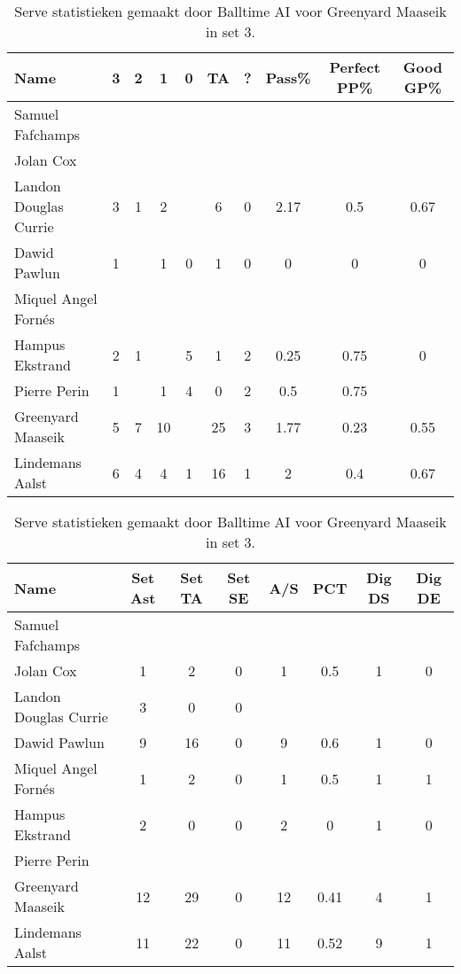 \begin{table}[ht!]
  \centering
  \scriptsize
  \begin{tabular}{|l|c|c|c|c|c|c|c|c|c|} \hline
    \textbf{Name} & 3 & 2 & 1 & 0 & TA & ? & Pass\% & Perfect PP\% & Good GP\% \\ \hline
    Samuel Fafchamps &   &   &   &   &   &   &   &   &   \\
    Jolan Cox &   &   &   &   &   &   &   &   &   \\
    Landon Douglas Currie & 3 & 1 & 2 &   & 6 & 0 & 2.17 & 0.5 & 0.67 \\
    Dawid Pawlun & 1 &   & 1 & 0 & 1 & 0 & 0 & 0 & 0 \\
    Miquel Angel Fornés &   &   &   &   &   &   &   &   &   \\
    Hampus Ekstrand & 2 & 1 &   & 5 & 1 & 2 & 0.25 & 0.75 & 0 \\
    Pierre Perin & 1 &   & 1 & 4 & 0 & 2 & 0.5 & 0.75 &   \\
    Greenyard Maaseik & 5 & 7 & 10 &   & 25 & 3 & 1.77 & 0.23 & 0.55 \\
    Lindemans Aalst & 6 & 4 & 4 & 1 & 16 & 1 & 2 & 0.4 & 0.67 \\ \hline
  \end{tabular}
  \caption[Receive statistieken gemaakt door Balltime AI voor Greenyard Maaseik in set 3]{\label{tab:PL3ReceiveGreenyard3}Serve statistieken gemaakt door Balltime AI voor Greenyard Maaseik in set 3.}
\end{table}

\begin{table}[ht!]
  \centering
  \scriptsize
  \begin{tabular}{|l|c|c|c|c|c|c|c|} \hline
    \textbf{Name} & Set Ast & Set TA & Set SE & A/S & PCT & Dig DS & Dig DE \\ \hline
    Samuel Fafchamps &   &   &   &   &   &   &   \\
    Jolan Cox & 1 & 2 & 0 & 1 & 0.5 & 1 & 0 \\
    Landon Douglas Currie & 3 & 0 & 0 &   &   &   &   \\
    Dawid Pawlun & 9 & 16 & 0 & 9 & 0.6 & 1 & 0 \\
    Miquel Angel Fornés & 1 & 2 & 0 & 1 & 0.5 & 1 & 1 \\
    Hampus Ekstrand & 2 & 0 & 0 & 2 & 0 & 1 & 0 \\
    Pierre Perin &   &   &   &   &   &   &   \\
    Greenyard Maaseik & 12 & 29 & 0 & 12 & 0.41 & 4 & 1 \\
    Lindemans Aalst & 11 & 22 & 0 & 11 & 0.52 & 9 & 1 \\ \hline
  \end{tabular}
  \caption[Setting en digging statistieken gemaakt door Balltime AI voor Greenyard Maaseik in set 3]{\label{tab:PL3SetDigGreenyard3}Serve statistieken gemaakt door Balltime AI voor Greenyard Maaseik in set 3.}
\end{table}

